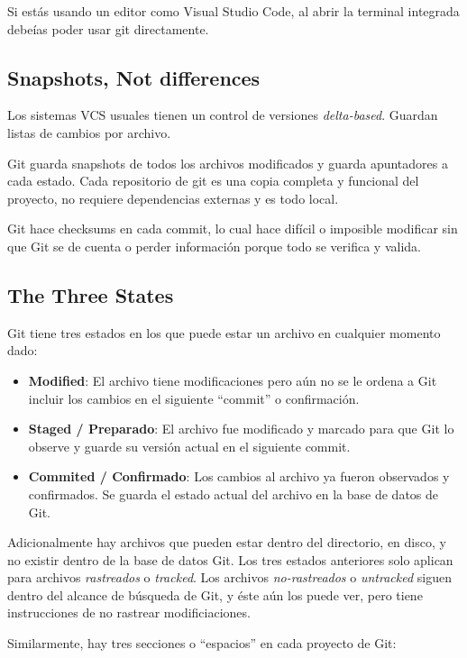 \documentclass[spanish, 12pt, a4paper]{article}
\begin{document}
Si estás usando un editor como Visual Studio Code, al abrir la terminal integrada debeías poder usar git directamente.

\subsection{Snapshots, Not differences}

Los sistemas VCS usuales tienen un control de versiones
\emph{delta-based}. Guardan listas de cambios por archivo.

Git guarda snapshots de todos los archivos modificados y guarda
apuntadores a cada estado. Cada repositorio de git es una copia completa
y funcional del proyecto, no requiere dependencias externas y es todo
local.

Git hace checksums en cada commit, lo cual hace difícil o imposible
modificar sin que Git se de cuenta o perder información porque todo se
verifica y valida.

\subsection{The Three States}

Git tiene tres estados en los que puede estar un archivo en cualquier
momento dado:

\begin{itemize}
\item
  \textbf{Modified}: El archivo tiene modificaciones pero
  aún no se le ordena a Git incluir los cambios en el siguiente ``commit''
  o confirmación.
\item
  \textbf{Staged / Preparado}: El archivo fue modificado y marcado para
  que Git lo observe y guarde su versión actual en el siguiente commit.
\item
  \textbf{Commited / Confirmado}: Los cambios al archivo ya fueron
  observados y confirmados. Se guarda el estado actual del archivo en la
  base de datos de Git.
\end{itemize}

Adicionalmente hay archivos que pueden estar dentro del directorio, en
disco, y no existir dentro de la base de datos Git. Los tres estados
anteriores solo aplican para archivos \emph{rastreados} o
\emph{tracked}. Los archivos \emph{no-rastreados} o \emph{untracked}
siguen dentro del alcance de búsqueda de Git, y éste aún los puede ver,
pero tiene instrucciones de no rastrear modificiaciones.

Similarmente, hay tres secciones o ``espacios'' en cada proyecto de Git:
\end{document}
